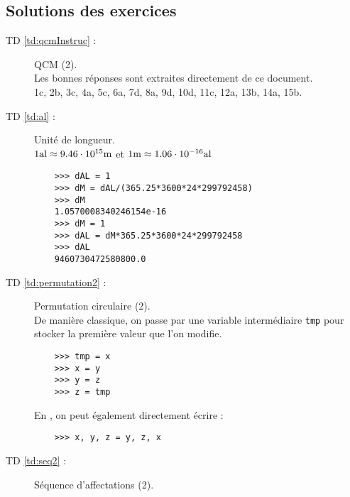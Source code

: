 \newpage
\subsection{Solutions des exercices}\label{sub:solutions}
\begin{description}
\item[TD \ref{td:qcmInstruc} :] QCM (2).\\
	Les bonnes réponses sont extraites directement de ce document.\\
	1c, 2b, 3c, 4a, 5c, 6a, 7d, 8a, 9d, 10d, 11c, 12a, 13b, 14a, 15b.
	
\item[TD \ref{td:al} :] Unité de longueur.\\
	$1 \rm{al} \approx 9.46\cdot 10^{15} \rm{m}$ et $1 \rm{m} \approx 1.06\cdot 10^{-16} \rm{al}$

	\begin{py}{12cm}
	\begin{verbatim}
	>>> dAL = 1
	>>> dM = dAL/(365.25*3600*24*299792458)
	>>> dM
	1.0570008340246154e-16
	>>> dM = 1
	>>> dAL = dM*365.25*3600*24*299792458
	>>> dAL
	9460730472580800.0
	\end{verbatim}
	\end{py}

\item[TD \ref{td:permutation2} :] Permutation circulaire (2).\\
	De manière classique, on passe par une variable intermédiaire {\tt tmp} pour stocker
	la première valeur que l'on modifie.

	\begin{py}{11cm}
	\begin{verbatim}
	>>> tmp = x
	>>> x = y
	>>> y = z
	>>> z = tmp
	\end{verbatim}
	\end{py}

	En \python, on peut également directement écrire :

	\begin{py}{11cm}
	\begin{verbatim}
	>>> x, y, z = y, z, x
	\end{verbatim}
	\end{py}

\item[TD \ref{td:seq2} :] Séquence d'affectations (2).


\end{description}
